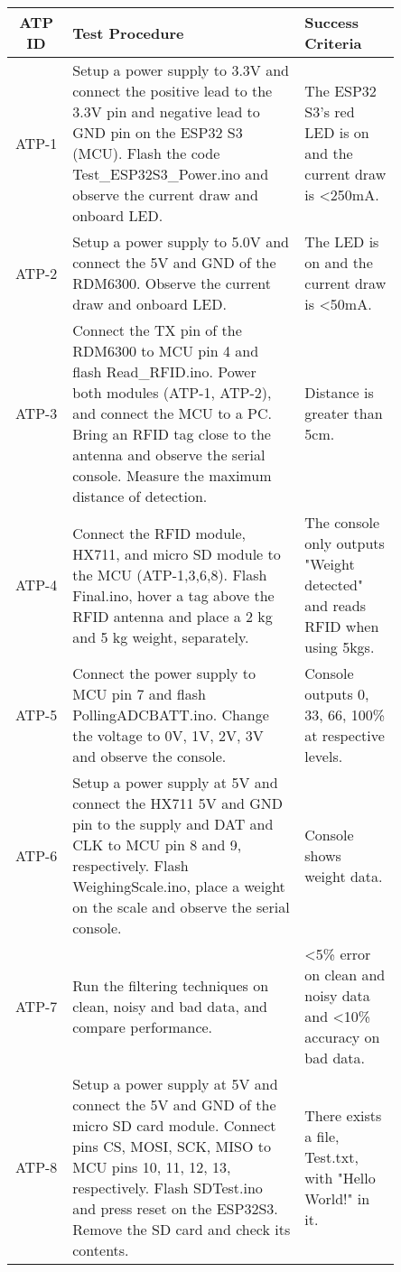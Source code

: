 \documentclass[class=report,11pt,crop=false]{standalone}
\begin{document}
\begin{table}[H]
    \centering
    \small
    {\begin{tabular}{|c|p{0.6\linewidth}|p{0.25\linewidth}|}
    \hline
    \textbf{ATP ID} & \textbf{Test Procedure} & \textbf{Success Criteria} \\
    \hline
    ATP-1 & Setup a power supply to 3.3V and connect the positive lead to the 3.3V pin and negative lead to GND pin on the ESP32 S3 (MCU). Flash the code Test\_ESP32S3\_Power.ino and observe the current draw and onboard LED. & The ESP32 S3's red LED is on and the current draw is <250mA. \\
    \hline
    ATP-2 & Setup a power supply to 5.0V and connect the 5V and GND of the RDM6300. Observe the current draw and onboard LED. & The LED is on and the current draw is <50mA. \\
    \hline
    ATP-3 & Connect the TX pin of the RDM6300 to MCU pin 4 and flash Read\_RFID.ino. Power both modules (ATP-1, ATP-2), and connect the MCU to a PC. Bring an RFID tag close to the antenna and observe the serial console. Measure the maximum distance of detection. & Distance is greater than 5cm. \\
    \hline
    ATP-4 & Connect the RFID module, HX711, and micro SD module to the MCU (ATP-1,3,6,8). Flash Final.ino, hover a tag above the RFID antenna and place a 2 kg and 5 kg weight, separately. & The console only outputs "Weight detected" and reads RFID when using 5kgs. \\
    \hline
    ATP-5 & Connect the power supply to MCU pin 7 and flash PollingADCBATT.ino. Change the voltage to 0V, 1V, 2V, 3V and observe the console. & Console outputs 0, 33, 66, 100\% at respective levels. \\
    \hline
    ATP-6 & Setup a power supply at 5V and connect the HX711 5V and GND pin to the supply and DAT and CLK to MCU pin 8 and 9, respectively. Flash WeighingScale.ino, place a weight on the scale and observe the serial console. & Console shows weight data. \\
    \hline
    ATP-7 & Run the filtering techniques on clean, noisy and bad data, and compare performance. & <5\% error on clean and noisy data and <10\% accuracy on bad data. \\
    \hline
    ATP-8 & Setup a power supply at 5V and connect the 5V and GND of the micro SD card module. Connect pins CS, MOSI, SCK, MISO to MCU pins 10, 11, 12, 13, respectively. Flash SDTest.ino and press reset on the ESP32S3. Remove the SD card and check its contents. & There exists a file, Test.txt, with "Hello World!" in it. \\

\end{tabular}}
\end{table}
\end{document}
